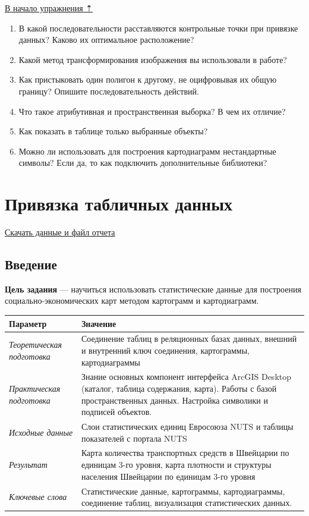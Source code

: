 \documentclass[]{book}
\theoremstyle{definition}
\theoremstyle{definition}
\theoremstyle{definition}
\theoremstyle{remark}
\begin{document}
\protect\hyperlink{map-ref-economic}{В начало упражнения ⇡}

\begin{enumerate}
\def\labelenumi{\arabic{enumi}.}
\item
  В какой последовательности расставляются контрольные точки при
  привязке данных? Каково их оптимальное расположение?
\item
  Какой метод трансформирования изображения вы использовали в работе?
\item
  Как пристыковать один полигон к другому, не оцифровывая их общую
  границу? Опишите последовательность действий.
\item
  Что такое атрибутивная и пространственная выборка? В чем их отличие?
\item
  Как показать в таблице только выбранные объекты?
\item
  Можно ли использовать для построения картодиаграмм нестандартные
  символы? Если да, то как подключить дополнительные библиотеки?
\end{enumerate}

\hypertarget{stat-map-economic}{%
\chapter{Привязка табличных данных}\label{stat-map-economic}}

\href{http://autolab.geogr.msu.ru/gis/data/Ex08.zip}{Скачать данные и
файл отчета}

\hypertarget{stat-map-economic-intro}{%
\section{Введение}\label{stat-map-economic-intro}}

\textbf{Цель задания} --- научиться использовать статистические данные
для построения социально-экономических карт методом картограмм и
картодиаграмм.

\begin{longtable}[]{@{}ll@{}}
\toprule
Параметр & Значение\tabularnewline
\midrule
\endhead
\emph{Теоретическая подготовка} & Соединение таблиц в реляционных базах
данных, внешний и внутренний ключ соединения, картограммы,
картодиаграммы\tabularnewline
\emph{Практическая подготовка} & Знание основных компонент интерфейса
ArcGIS Desktop (каталог, таблица содержания, карта). Работы с базой
пространственных данных. Настройка символики и подписей
объектов.\tabularnewline
\emph{Исходные данные} & Слои статистических единиц Евросоюза NUTS и
таблицы показателей с портала NUTS\tabularnewline
\emph{Результат} & Карта количества транспортных средств в Швейцарии по
единицам 3-го уровня, карта плотности и структуры населения Швейцарии по
единицам 3-го уровня\tabularnewline
\emph{Ключевые слова} & Статистические данные, картограммы,
картодиаграммы, соединение таблиц, визуализация статистических
данных.\tabularnewline
\bottomrule
\end{longtable}
\end{document}
